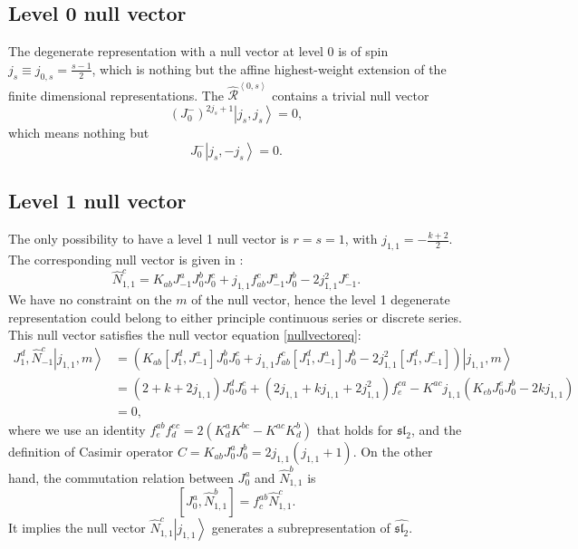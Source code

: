 \documentclass[10pt,a4paper]{article}
\numberwithin{equation}{section}
\newcommand{\ket}[1]{\left| #1 \right\rangle}
\newcommand{\vev}[1]{\left\langle #1 \right\rangle}
\begin{document}
\subsection{Level 0 null vector}
The degenerate representation with a null vector at level 0 is of spin $j_{s} \equiv j_{0,s}  = \frac{s-1}{2}$, which is nothing but the affine 
highest-weight extension of the finite dimensional representations. The $\widehat{\mathcal{R}}^{\vev{0,s}}$ contains a trivial null 
vector 
\begin{equation}
    \left(J^{-}_{0}\right)^{2j_{s}+1}\ket{j_{s},j_{s}} = 0,
\end{equation}
which means nothing but 
\begin{equation}
    J^{-}_{0} \ket{j_{s},-j_{s}} = 0.
\end{equation}

\subsection{Level 1 null vector}
The only possibility to have a level 1 null vector is $r = s = 1$, with $j_{1,1} = -\frac{k+2}{2}$. 
The corresponding null vector is given in \cite{Stocco:2022gah}:
\begin{equation}
    \hat{N}^{c}_{1,1} = K_{ab} J^{a}_{-1} J^{b}_{0} J^{c}_{0} + j_{1,1} f^{c}_{ab} J^{a}_{-1} J^{b}_{0} - 2 j^{2}_{1,1} J^{c}_{-1}. \label{nullvector}
\end{equation}
We have no constraint on the $m$ of the null vector, hence the level 1 degenerate representation could belong to either 
principle continuous series or discrete series. This null vector satisfies the null vector equation \ref{nullvectoreq}:
\begin{equation}
    \begin{aligned}
        J^{d}_{1}, \hat{N}^{c}_{-1} \ket{j_{1,1},m}
        &= \left( K_{ab} \left[J^{d}_{1},J^{a}_{-1}\right] J^{b}_{0} J^{c}_{0} + j_{1,1} f^{c}_{ab} \left[J^{d}_{1},J^{a}_{-1}\right] J^{b}_{0} - 2 j^{2}_{1,1} \left[J^{d}_{1},J^{c}_{-1}\right] \right)\ket{j_{1,1},m} \\
        &= (2+k+2j_{1,1})J^{d}_{0} J^{c}_{0} + (2j_{1,1} + kj_{1,1}+2j^{2}_{1,1})f^{ca}_{e} - K^{ac}j_{1,1}(K_{eb}J^{e}_{0}J^{b}_{0}-2k j_{1,1})\\
        &= 0,
    \end{aligned}
\end{equation}
where we use an identity $f^{ab}_{e} f^{ec}_{d} = 2(K^{a}_{d}K^{bc}- K^{ac}K^{b}_{d})$ that holds for $\mathfrak{sl}_{2}$, and 
the definition of Casimir operator $C = K_{ab} J^{a}_{0} J^{b}_{0} = 2j_{1,1}(j_{1,1}+1)$. On the other hand, the commutation relation 
between $J^{a}_{0}$ and $\hat{N}^{b}_{1,1}$ is 
\begin{equation}
    \left[ J^{a}_{0},\hat{N}^{b}_{1,1} \right] = f^{ab}_{c} \hat{N}^{c}_{1,1}. \label{CRJN}
\end{equation}
It implies the null vector $\hat{N}^{c}_{1,1} \ket{j_{1,1}}$ generates a subrepresentation of $\widehat{\mathfrak{sl}_{2}}$.
\end{document}

